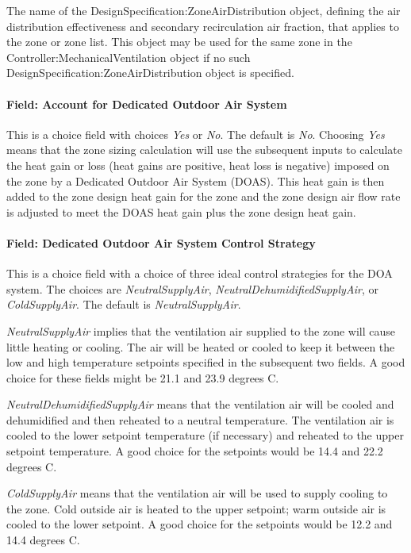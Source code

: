 The name of the DesignSpecification:ZoneAirDistribution object, defining the air distribution effectiveness and secondary recirculation air fraction, that applies to the zone or zone list. This object may be used for the same zone in the Controller:MechanicalVentilation object if no such DesignSpecification:ZoneAirDistribution object is specified.

\paragraph{Field: Account for Dedicated Outdoor Air System}\label{field-account-for-dedicated-outdoor-air-system}

This is a choice field with choices \emph{Yes} or \emph{No}. The default is \emph{No}. Choosing \emph{Yes} means that the zone sizing calculation will use the subsequent inputs to calculate the heat gain or loss (heat gains are positive, heat loss is negative) imposed on the zone by a Dedicated Outdoor Air System (DOAS). This heat gain is then added to the zone design heat gain for the zone and the zone design air flow rate is adjusted to meet the DOAS heat gain plus the zone design heat gain.

\paragraph{Field: Dedicated Outdoor Air System Control Strategy}\label{field-dedicated-outdoor-air-system-control-strategy}

This is a choice field with a choice of three ideal control strategies for the DOA system. The choices are \emph{NeutralSupplyAir}, \emph{NeutralDehumidifiedSupplyAir}, or \emph{ColdSupplyAir}. The default is \emph{NeutralSupplyAir}.

\emph{NeutralSupplyAir} implies that the ventilation air supplied to the zone will cause little heating or cooling. The air will be heated or cooled to keep it between the low and high temperature setpoints specified in the subsequent two fields. A good choice for these fields might be 21.1 and 23.9 degrees C.

\emph{NeutralDehumidifiedSupplyAir} means that the ventilation air will be cooled and dehumidified and then reheated to a neutral temperature. The ventilation air is cooled to the lower setpoint temperature (if necessary) and reheated to the upper setpoint temperature. A good choice for the setpoints would be 14.4 and 22.2 degrees C.

\emph{ColdSupplyAir} means that the ventilation air will be used to supply cooling to the zone. Cold outside air is heated to the upper setpoint; warm outside air is cooled to the lower setpoint. A good choice for the setpoints would be 12.2 and 14.4 degrees C.

